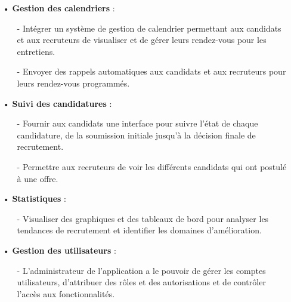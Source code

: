 \begin{itemize}
   \item[•] \textbf{Gestion des calendriers} :
   \begin{itemize}
    \setlength{\itemsep}{0.2cm}
       \item[-] Intégrer un système de gestion de calendrier permettant aux 
       candidats et aux recruteurs de visualiser et de gérer leurs 
       rendez-vous pour les entretiens.
       \item[-] Envoyer des rappels automatiques aux candidats et aux recruteurs pour leurs rendez-vous programmés.
   \end{itemize}
   
   \item[•] \textbf{Suivi des candidatures} :
   \begin{itemize}
    \setlength{\itemsep}{0.2cm}
       \item[-] Fournir aux candidats une interface pour suivre l'état 
       de chaque candidature, de la soumission initiale jusqu'à la 
       décision finale de recrutement.
       \item[-] Permettre aux recruteurs de voir les différents candidats 
       qui ont postulé à une offre.
   \end{itemize}
   
   \item[•] \textbf{Statistiques} :
   \begin{itemize}
    \setlength{\itemsep}{0.2cm}
       \item[-] Visualiser des graphiques et des tableaux de bord pour analyser les tendances de recrutement et identifier les domaines d'amélioration.
   \end{itemize}
   
   \item[•] \textbf{Gestion des utilisateurs} :
   \begin{itemize}
    \setlength{\itemsep}{0.2cm}
       \item[-] L'administrateur de l'application a le pouvoir de gérer les comptes utilisateurs, d'attribuer des rôles et des autorisations et de contrôler l'accès aux fonctionnalités.
       
   \end{itemize}
\end{itemize}



